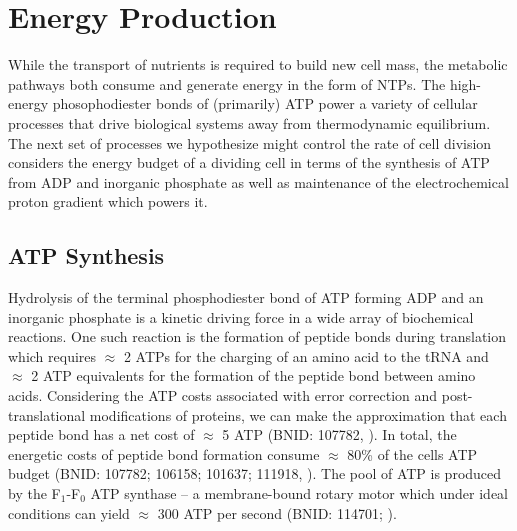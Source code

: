 \section{Energy Production}

While the transport of nutrients is required to build new cell mass, the
metabolic pathways both consume and generate energy
in the form of NTPs. The high-energy phosophodiester bonds of (primarily) ATP
power a variety of cellular processes that drive biological systems away
from thermodynamic equilibrium. The next set of processes we hypothesize might
control the rate of cell division considers the energy budget
of a dividing cell in terms of the synthesis of ATP from ADP and inorganic
phosphate as well as maintenance of the electrochemical proton gradient which powers it.

\subsection{ATP Synthesis}

Hydrolysis of the terminal phosphodiester bond of ATP forming ADP and an
inorganic phosphate is a kinetic driving force in a wide array of biochemical
reactions. One such reaction is the formation of peptide bonds during
translation which requires $\approx$ 2 ATPs for the charging of an amino acid
to the tRNA and $\approx$ 2 ATP equivalents for the formation of the peptide
bond between amino acids. Considering the ATP costs associated with error
correction and post-translational modifications of proteins, we can make the
approximation that each peptide bond has a net cost of $\approx$ 5 ATP (BNID:
107782, \cite{milo2010}). In total, the energetic costs of peptide bond
formation consume $\approx$
80\% of the cells ATP budget (BNID: 107782; 106158; 101637; 111918,
\cite{milo2010, lynch2015,stouthamer1973}). The pool of ATP is produced by
the F$_1$-F$_0$ ATP synthase
-- a membrane-bound rotary motor which under ideal conditions can yield
$\approx$ 300 ATP per second (BNID: 114701; \cite{milo2010, weber2003}).


